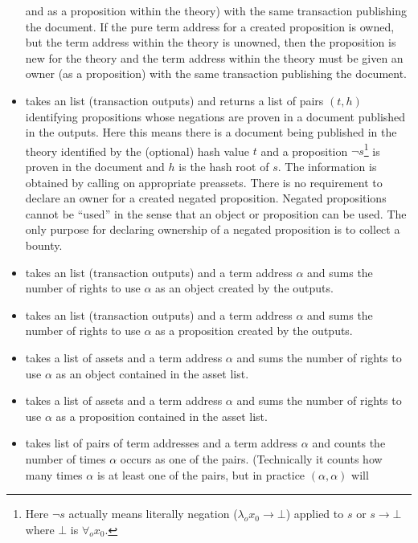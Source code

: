 \begin{itemize}
and as a proposition within the theory) with the same transaction
publishing the document.
If the pure term address for a created proposition is owned,
but the term address within the theory is unowned, then
the proposition is new for the theory and the term address within the theory
must be given an owner (as a proposition) with the same transaction
publishing the document.
\item {} takes
an {} list (transaction outputs)
and returns a list of pairs $(t,h)$
identifying propositions whose negations are proven in a document published in the outputs.
Here this means there is a document being published in the theory identified by the
(optional) hash value $t$
and a proposition $\neg s$\footnote{Here $\neg s$ actually means literally negation ($\lambda_o x_0\to\bot$) applied to $s$ or $s\to\bot$ where $\bot$ is $\forall_o x_0$.}
is proven in the document and $h$ is the hash root of $s$.
The information is obtained by calling {} on appropriate preassets.
There is no requirement to declare an owner for a created negated proposition.
Negated propositions cannot be ``used'' in the sense that an object or proposition can
be used. The only purpose for declaring ownership of a negated proposition is to collect a bounty.
\item {} takes an {} list (transaction outputs)
and a term address $\alpha$ and sums the number of rights to use $\alpha$ as an object
created by the outputs.
\item {} takes an {} list (transaction outputs)
and a term address $\alpha$ and sums the number of rights to use $\alpha$ as a proposition
created by the outputs.
\item {} takes a list of assets and a term address $\alpha$
and sums the number of rights to use $\alpha$ as an object contained in the asset list.
\item {} takes a list of assets and a term address $\alpha$
and sums the number of rights to use $\alpha$ as a proposition contained in the asset list.
\item {} takes list of pairs of term addresses and a term address $\alpha$
and counts the number of times $\alpha$ occurs as one of the pairs. (Technically it counts
how many times $\alpha$ is at least one of the pairs, but in practice $(\alpha,\alpha)$ will

\end{itemize}
